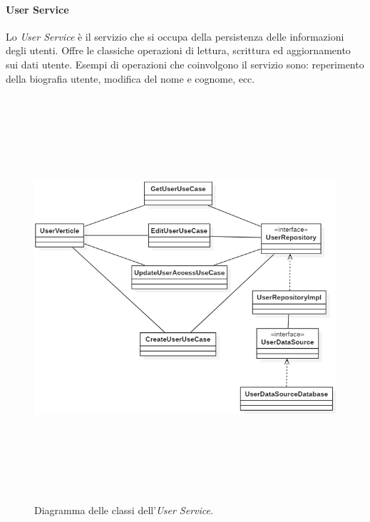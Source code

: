 \paragraph{User Service}
Lo \textit{User Service} è il servizio che si occupa della persistenza delle informazioni degli utenti. Offre le classiche operazioni di lettura, scrittura ed aggiornamento sui dati utente. Esempi di operazioni che coinvolgono il servizio sono: reperimento della biografia utente, modifica del nome e cognome, ecc.
\begin{figure}
  \centering
  \includegraphics[height=15cm, width=12cm,
		keepaspectratio]{images/UserServiceClassDiagram.png}
  \caption{Diagramma delle classi dell'\textit{User Service}.}
  \label{fig:user-service-class-diagram}
\end{figure}

